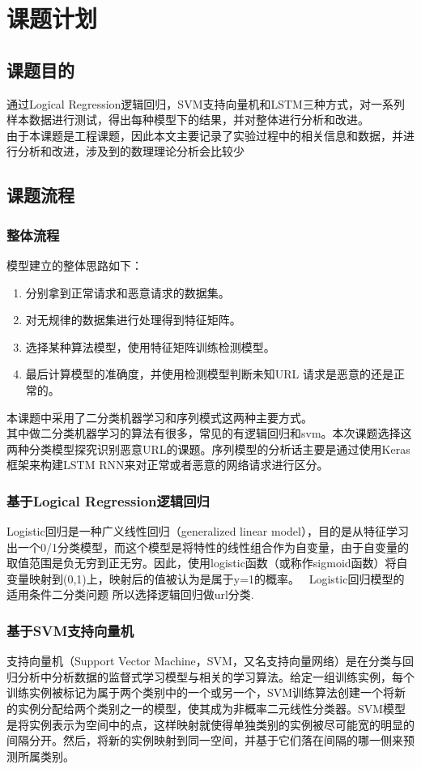 \section{课题计划}
\subsection{课题目的}
通过Logical Regression逻辑回归，SVM支持向量机和LSTM三种方式，对一系列样本数据进行测试，得出每种模型下的结果，并对整体进行分析和改进。
\\\indent{}由于本课题是工程课题，因此本文主要记录了实验过程中的相关信息和数据，并进行分析和改进，涉及到的数理理论分析会比较少
\subsection{课题流程}
\subsubsection{整体流程}
模型建立的整体思路如下： 
\begin{enumerate}
    \item 分别拿到正常请求和恶意请求的数据集。 
    \item 对无规律的数据集进行处理得到特征矩阵。 
    \item 选择某种算法模型，使用特征矩阵训练检测模型。
    \item 最后计算模型的准确度，并使用检测模型判断未知URL 请求是恶意的还是正常的。
\end{enumerate}
本课题中采用了二分类机器学习和序列模式这两种主要方式。
\\\indent{}其中做二分类机器学习的算法有很多，常见的有逻辑回归和svm。本次课题选择这两种分类模型探究识别恶意URL的课题。序列模型的分析话主要是通过使用Keras框架来构建LSTM RNN来对正常或者恶意的网络请求进行区分。
\subsubsection{基于Logical Regression逻辑回归}
Logistic回归是一种广义线性回归（generalized linear model），目的是从特征学习出一个0/1分类模型，而这个模型是将特性的线性组合作为自变量，由于自变量的取值范围是负无穷到正无穷。因此，使用logistic函数（或称作sigmoid函数）将自变量映射到(0,1)上，映射后的值被认为是属于y=1的概率。 
Logistic回归模型的适用条件二分类问题 所以选择逻辑回归做url分类.
\subsubsection{基于SVM支持向量机}
支持向量机（Support Vector Machine，SVM，又名支持向量网络）是在分类与回归分析中分析数据的监督式学习模型与相关的学习算法。给定一组训练实例，每个训练实例被标记为属于两个类别中的一个或另一个，SVM训练算法创建一个将新的实例分配给两个类别之一的模型，使其成为非概率二元线性分类器。SVM模型是将实例表示为空间中的点，这样映射就使得单独类别的实例被尽可能宽的明显的间隔分开。然后，将新的实例映射到同一空间，并基于它们落在间隔的哪一侧来预测所属类别。
